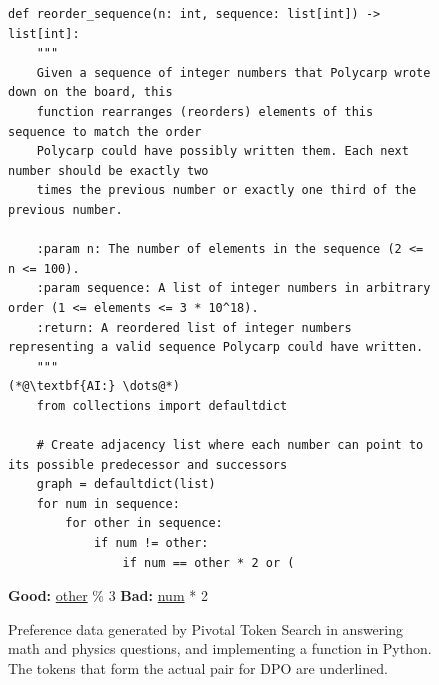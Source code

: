 \documentclass[11pt]{article}
\begin{document}
\begin{figure}
\begin{AIbox}{}
\begin{minipage}{0.99\textwidth}
\begin{lstlisting}[breaklines=true]
def reorder_sequence(n: int, sequence: list[int]) -> list[int]:
    """
    Given a sequence of integer numbers that Polycarp wrote down on the board, this
    function rearranges (reorders) elements of this sequence to match the order
    Polycarp could have possibly written them. Each next number should be exactly two
    times the previous number or exactly one third of the previous number.

    :param n: The number of elements in the sequence (2 <= n <= 100).
    :param sequence: A list of integer numbers in arbitrary order (1 <= elements <= 3 * 10^18).
    :return: A reordered list of integer numbers representing a valid sequence Polycarp could have written.
    """
(*@\textbf{AI:} \dots@*)
    from collections import defaultdict

    # Create adjacency list where each number can point to its possible predecessor and successors
    graph = defaultdict(list)
    for num in sequence:
        for other in sequence:
            if num != other:
                if num == other * 2 or (
\end{lstlisting}\vspace{-0.5em}
\textbf{Good:} \underline{other} \% 3 \hspace{2em} \textbf{Bad:} \underline{num} * 2
\end{minipage}
\end{AIbox}
    \caption{Preference data generated by Pivotal Token Search in answering math and physics questions, and implementing a function in Python. The tokens that form the actual pair for DPO are underlined.}
    \label{fig:pts-dpo-examples}
\end{figure}
\end{document}
